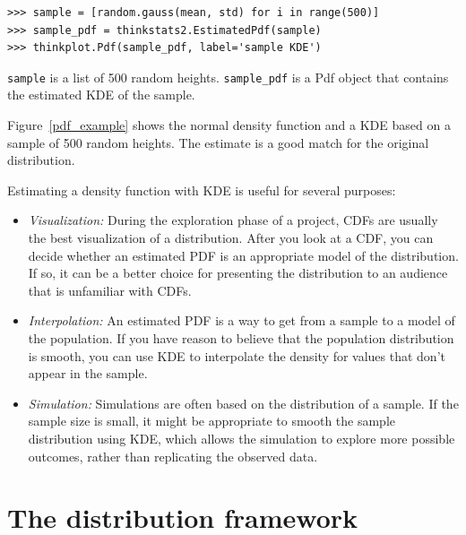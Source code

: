 \documentclass[12pt]{book}
\begin{document}
\begin{verbatim}
>>> sample = [random.gauss(mean, std) for i in range(500)]
>>> sample_pdf = thinkstats2.EstimatedPdf(sample)
>>> thinkplot.Pdf(sample_pdf, label='sample KDE')
\end{verbatim}

\verb"sample" is a list of 500 random heights.
\verb"sample_pdf" is a Pdf object that contains the estimated
KDE of the sample.

Figure~\ref{pdf_example} shows the normal density function and a KDE
based on a sample of 500 random heights.  The estimate is a good
match for the original distribution.

Estimating a density function with KDE is useful for several purposes:

\begin{itemize}

\item {\it Visualization:\/} During the exploration phase of a project, CDFs
  are usually the best visualization of a distribution.  After you
  look at a CDF, you can decide whether an estimated PDF is an
  appropriate model of the distribution.  If so, it can be a better
  choice for presenting the distribution to an audience that is
  unfamiliar with CDFs.

\item {\it Interpolation:\/} An estimated PDF is a way to get from a sample
  to a model of the population.  If you have reason to believe that
  the population distribution is smooth, you can use KDE to interpolate
  the density for values that don't appear in the sample.

\item {\it Simulation:\/} Simulations are often based on the distribution
  of a sample.  If the sample size is small, it
  might be appropriate to smooth the sample distribution using KDE,
  which allows the simulation to explore more possible outcomes,
  rather than replicating the observed data.

\end{itemize}


\section{The distribution framework}
\end{document}
